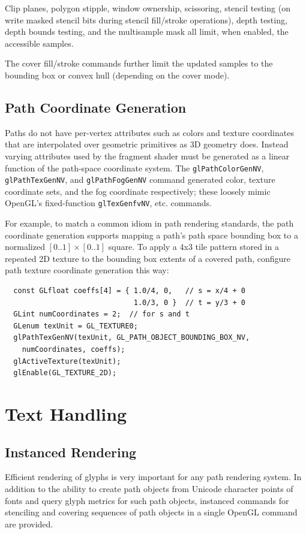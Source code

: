 Clip planes, polygon stipple, window ownership, scissoring, stencil
testing (on write masked stencil bits during stencil fill/stroke
operations), depth testing, depth bounds testing, and the multisample
mask all limit, when enabled, the accessible samples.

The cover fill/stroke commands further limit the updated samples to the
bounding box or convex hull (depending on the cover mode). 

\subsection{Path Coordinate Generation}

Paths do not have per-vertex attributes such as colors and texture
coordinates that are interpolated over geometric primitives as 3D
geometry does.  Instead varying attributes used by the fragment shader
must be generated as a linear function of the path-space coordinate
system.  The {\tt glPathColorGenNV}, {\tt glPathTexGenNV}, and {\tt glPathFogGenNV}
command generated color, texture coordinate sets, and the fog coordinate
respectively; these loosely mimic OpenGL's fixed-function {\tt glTexGenfvNV},
etc. commands.

For example, to match a common idiom in path rendering standards, the path coordinate
generation supports mapping a path's path space bounding box to a
normalized $[0..1]\times[0..1]$ square.  To apply a 4x3 tile pattern stored in
a repeated 2D texture to the bounding box extents of a covered path, 
configure path texture coordinate generation this way:
\begin{lstlisting}
  const GLfloat coeffs[4] = { 1.0/4, 0,   // s = x/4 + 0
                              1.0/3, 0 }  // t = y/3 + 0
  GLint numCoordinates = 2;  // for s and t
  GLenum texUnit = GL_TEXTURE0;
  glPathTexGenNV(texUnit, GL_PATH_OBJECT_BOUNDING_BOX_NV,
    numCoordinates, coeffs);
  glActiveTexture(texUnit);
  glEnable(GL_TEXTURE_2D);
\end{lstlisting}

\section{Text Handling}
\label{api:text}

\subsection{Instanced Rendering}

Efficient rendering of glyphs is very important for any path rendering
system.  In addition to the ability to create path objects from Unicode
character points of fonts and query glyph metrics for such path objects,
instanced commands for stenciling and covering sequences of path objects
in a single OpenGL command are provided.

